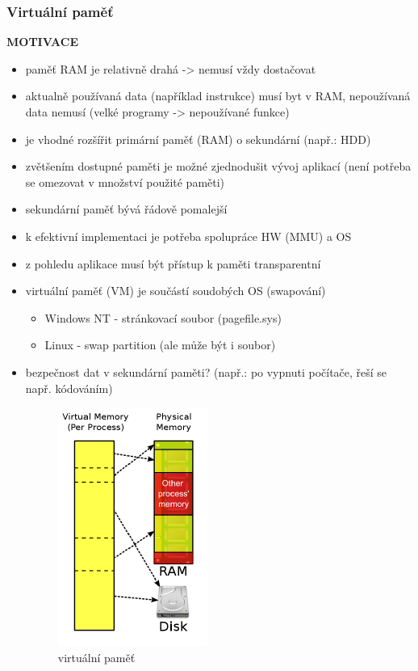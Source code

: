 \documentclass[10pt,a4paper]{article}
\begin{document}
\subsubsection{Virtuální paměť}
\textbf{MOTIVACE}
\begin{itemize}
	\item paměť RAM je relativně drahá -> nemusí vždy dostačovat
	\item aktualně používaná data (například instrukce) musí byt v RAM, nepoužívaná data nemusí (velké
programy -> nepoužívané funkce)
	\item je vhodné rozšířit primární paměť (RAM) o sekundární (např.: HDD)
	\item zvětšením dostupné paměti je možné zjednodušit vývoj aplikací (není potřeba se omezovat
v množství použité paměti)
	\item sekundární paměť bývá řádově pomalejší
	\item k efektivní implementaci je potřeba spolupráce HW (MMU) a OS
	\item z pohledu aplikace musí být přístup k paměti transparentní
	\item virtuální paměť (VM) je součástí soudobých OS (swapování)
	\begin{itemize}
		\item Windows NT - stránkovací soubor (pagefile.sys)
		\item Linux - swap partition (ale může být i soubor)
	\end{itemize}
	\item bezpečnost dat v sekundární paměti? (např.: po vypnuti počítače, řeší se např. kódováním)
	\begin{figure} [h]
		\includegraphics[scale=1]{img/virtualni_pamet.png}
		\caption{virtuální paměť}	
	\end{figure}
\end{itemize}
\end{document}

